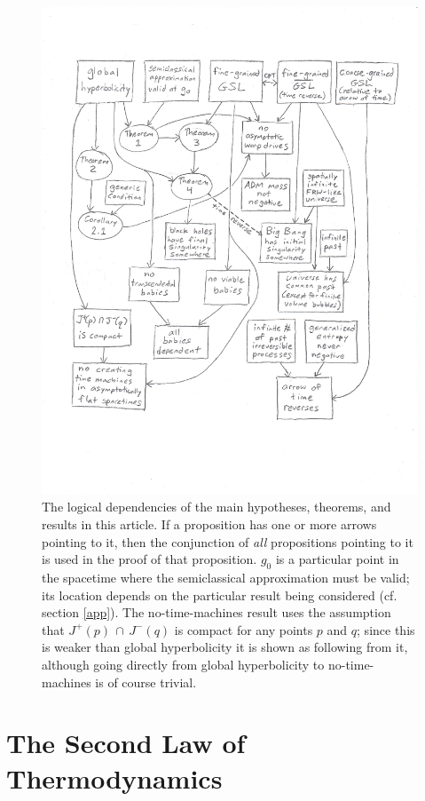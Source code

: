 \documentclass{article}
\begin{document}
\begin{figure}[p]
\centering
\includegraphics[width=1.1\textwidth, trim=0 1.5in 0 0, clip=true]{chart.eps}
\caption{The logical dependencies of the main hypotheses, theorems, and results in this article.  If a proposition has one or more arrows pointing to it, then the conjunction of \emph{all} propositions pointing to it is used in the proof of that proposition.  $g_0$ is a particular point in the spacetime where the semiclassical approximation must be valid; its location depends on the particular result being considered (cf. section \ref{app}).  The no-time-machines result uses the assumption that $J^+(p)\,\cap\,J^{-}(q)$ is compact for any points $p$ and $q$; since this is weaker than global hyperbolicity it is shown as following from it, although going directly from global hyperbolicity to no-time-machines is of course trivial.}\label{chart}
\end{figure}

\section{The Second Law of Thermodynamics}\label{second}
\end{document}
